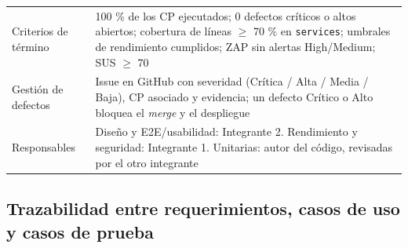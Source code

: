 \documentclass[11pt,a4paper]{article}
\begin{document}
\begin{longtable}{@{}>{\raggedright\arraybackslash\hspace{0pt}}p{}>{\raggedright\arraybackslash\hspace{0pt}}p{}@{}}
Criterios de término & 100 \% de los CP ejecutados; 0 defectos críticos o altos abiertos; cobertura de líneas \ensuremath{\geq} 70 \% en \texttt{services}; umbrales de rendimiento cumplidos; ZAP sin alertas High/Medium; SUS \ensuremath{\geq} 70 \\ \addlinespace[0.25em]
Gestión de defectos & Issue en GitHub con severidad (Crítica / Alta / Media / Baja), CP asociado y evidencia; un defecto Crítico o Alto bloquea el \textit{merge} y el despliegue \\ \addlinespace[0.25em]
\mbox{Responsables} & Diseño y E2E/usabilidad: Integrante 2. Rendimiento y seguridad: Integrante 1. Unitarias: autor del código, revisadas por el otro integrante \\
\end{longtable}
\endgroup

\subsection{Trazabilidad entre requerimientos, casos de uso y casos de prueba}
\end{document}
